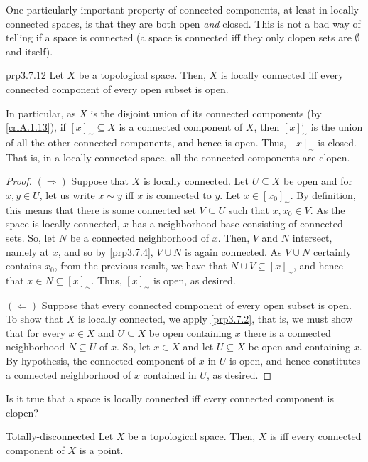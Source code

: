 One particularly important property of connected components, at least in locally connected spaces, is that they are both open \emph{and} closed.  This is not a bad way of telling if a space is connected (a space is connected iff they only clopen sets are $\emptyset$ and itself).
\begin{prp}{}{prp3.7.12}
Let $X$ be a topological space.  Then, $X$ is locally connected iff every connected component of every open subset is open.
\begin{rmk}
In particular, as $X$ is the disjoint union of its connected components (by \cref{crlA.1.13}), if $[x]_{\sim}\subseteq X$ is a connected component of $X$, then $[x]_{\sim}^{\comp}$ is the union of all the other connected components, and hence is open.  Thus, $[x]_{\sim}$ is closed.  That is, in a locally connected space, all the connected components are clopen.
\end{rmk}
\begin{proof}
$(\Rightarrow )$ Suppose that $X$ is locally connected.  Let $U\subseteq X$ be open and for $x,y\in U$, let us write $x\sim y$ iff $x$ is connected to $y$.  Let $x\in [x_0]_{\sim}$.  By definition, this means that there is some connected set $V\subseteq U$ such that $x,x_0\in V$.  As the space is locally connected, $x$ has a neighborhood base consisting of connected sets.  So, let $N$ be a connected neighborhood of $x$.  Then, $V$ and $N$ intersect, namely at $x$, and so by \cref{prp3.7.4}, $V\cup N$ is again connected.  As $V\cup N$ certainly contains $x_0$, from the previous result, we have that $N\cup V\subseteq [x]_{\sim}$, and hence that $x\in N\subseteq [x]_{\sim}$.  Thus, $[x]_{\sim}$ is open, as desired.

\blankline
\noindent
$(\Leftarrow )$ Suppose that every connected component of every open subset is open.  To show that $X$ is locally connected, we apply \cref{prp3.7.2}, that is, we must show that for every $x\in X$ and $U\subseteq X$ be open containing $x$ there is a connected neighborhood $N\subseteq U$ of $x$.  So, let $x\in X$ and let $U\subseteq X$ be open and containing $x$.  By hypothesis, the connected component of $x$ in $U$ is open, and hence constitutes a connected neighborhood of $x$ contained in $U$, as desired.
\end{proof}
\end{prp}
\begin{exr}{}{}
Is it true that a space is locally connected iff every connected component is clopen?
\end{exr}
\begin{dfn}{Totally-disconnected}{}
Let $X$ be a topological space.  Then, $X$ is  iff every connected component of $X$ is a point.
\end{dfn}
